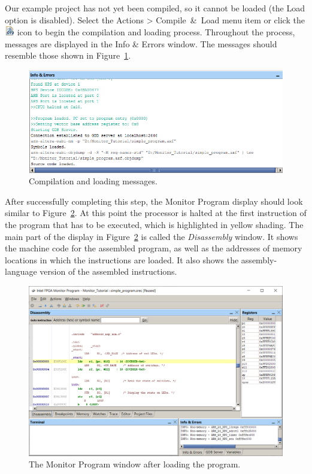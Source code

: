 \documentclass[11pt, twoside, pdftex]{article}
\begin{document}
Our example project has not yet been compiled, so it cannot be
loaded (the \textsf{Load} option is disabled).  
Select the \textsf{Actions > Compile~\&~Load} menu item
or click the \includegraphics{toolbar/compile_load.png} icon to
begin the compilation and loading process.  
Throughout the process, messages are displayed in 
the \textsf{Info \& Errors} window. The messages should resemble
those shown in Figure~\ref{fig:12}.

\begin{figure}[H]
   \begin{center}
      \includegraphics[scale=.65]{screenshots/figure12.png}
   \end{center}
   \caption{Compilation and loading messages.}
	 \label{fig:12}
\end{figure}

After successfully completing this step, the Monitor Program display should look similar to Figure~\ref{fig:13}. At this point the
processor is halted at the first instruction of the program that
has to be executed, which is highlighted in yellow shading.
The main part of the display in Figure~\ref{fig:13} is called the
{\it Disassembly} window. 
It shows the machine code for the assembled program,
as well as the addresses of memory locations in which the
instructions are loaded. It also shows the assembly-language
version of the assembled instructions.


\begin{figure}[H]
   \begin{center}
      \includegraphics[scale=0.6]{screenshots/figure13.png}
   \end{center}
   \caption{The Monitor Program window after loading the program.} 
	 \label{fig:13}
\end{figure}
\end{document}
